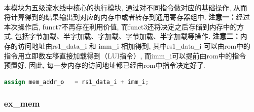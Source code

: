 \documentclass[lang=cn,11pt,a4paper,chinesefont=founder]{elegantpaper}
\begin{document}
\\
本模块为五级流水线中核心的执行模块, 通过对不同指令做对应的基础操作, 从而将计算得到的结果输出到对应的内存中或者转存到通用寄存器组中. 
\textbf{注意一：}经过本次操作后, funct7不再存在利用价值, 而funct3还将决定之后存储到内存中的方式, 包括字节加载、半字加载、字加载、字节加载、半字加载等操作. 
\textbf{注意二：}内存的访问地址由rs1\_data\_i 和 imm\_i 相加得到, 其中rs1\_data\_i 可以由rom中的指令用立即数左移直接加载得到（LUI指令）, 而imm\_i可以提前由rom中的指令预置好, 因此, 每一步内存的访问地址都已经由rom中指令决定好了. 
\begin{lstlisting}[language=verilog]
assign mem_addr_o   = rs1_data_i + imm_i;
\end{lstlisting}
\subsubsection{ex\_mem}
\end{document}
